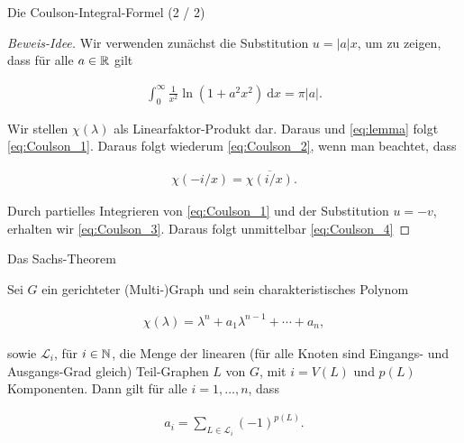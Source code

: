 \documentclass[aspectratio = 169]{beamer}
\begin{document}
\begin{frame}{Die Coulson-Integral-Formel (2 / 2)}
    
    \begin{proof}[Beweis-Idee]

        Wir verwenden zunächst die Substitution $u = |a| x$, um zu zeigen, dass für alle $a \in \mathbb R$ gilt

        \begin{align} \label{eq:lemma}
            \int_0^\infty
                \frac{1}{x^2}
                \ln(1 + a^2 x^2)
                ~ \mathrm d x
            =
            \pi |a|.
        \end{align}

        Wir stellen $\chi(\lambda)$ als Linearfaktor-Produkt dar.
        Daraus und \eqref{eq:lemma} folgt \eqref{eq:Coulson_1}.
        Daraus folgt wiederum \eqref{eq:Coulson_2}, wenn man beachtet, dass

        \begin{align*}
            \chi(-i/x) = \overline{\chi(i/x)}.
        \end{align*}

        Durch partielles Integrieren von \eqref{eq:Coulson_1} und der Substitution $u = -v$, erhalten wir \eqref{eq:Coulson_3}.
        Daraus folgt unmittelbar \eqref{eq:Coulson_4}

    \end{proof}

\end{frame}


\begin{frame}{Das Sachs-Theorem}
    
    \begin{theorem}
        Sei $G$ ein gerichteter (Multi-)Graph und sein charakteristisches Polynom

        \begin{align*}
            \chi(\lambda)
            =
            \lambda^n + a_1 \lambda^{n-1} + \cdots + a_n,
        \end{align*}

        sowie $\mathcal L_i$, für $i \in \mathbb N$, die Menge der linearen (für alle Knoten sind Eingangs- und Ausgangs-Grad gleich) Teil-Graphen $L$ von $G$, mit $i = V(L)$ und $p(L)$ Komponenten.
        Dann gilt für alle $i = 1, \dots, n$, dass

        \begin{align*}
            a_i = \sum_{L \in \mathcal L_i} (-1)^{p(L)}.
        \end{align*}

    \end{theorem}

\end{frame}
\end{document}
